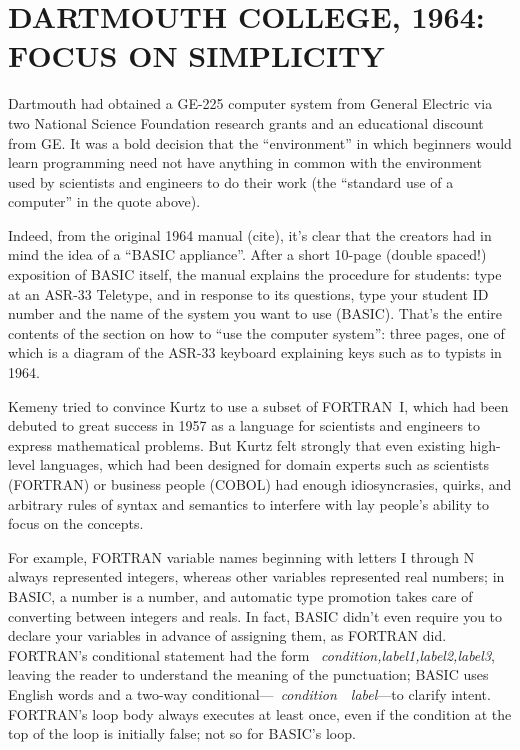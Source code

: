 \documentclass{article}
\begin{document}
\section{DARTMOUTH COLLEGE, 1964: FOCUS ON SIMPLICITY}



Dartmouth had obtained a GE-225 computer system from General Electric
via two National Science Foundation research grants and
an educational discount from GE.  It was a bold decision that the
``environment'' in which beginners would learn programming need not have
anything in common with the environment used by scientists and engineers
to do their work (the ``standard use of a computer'' in the quote above).

Indeed, from the original 1964 manual (cite), it's clear that the
creators had in mind the idea of a ``BASIC appliance''.
After a short 10-page (double spaced!) exposition of BASIC itself, the
manual explains the procedure for students: type  at an ASR-33
Teletype, and in response to its questions, type your student ID number
and the name of the system you want to use (BASIC).
That's the entire contents of the section on how to ``use the computer
system'': three pages, one of which is a diagram of the ASR-33 keyboard
explaining keys such as  to typists in 1964.



Kemeny tried to convince Kurtz to use a subset of FORTRAN~I, which had
been debuted to great success in 1957 as a language for scientists and
engineers to express mathematical problems.  
But Kurtz felt strongly that even existing high-level
languages, which had been designed for domain experts such as scientists
(FORTRAN) or business people (COBOL) 
had enough idiosyncrasies, quirks, and arbitrary rules of syntax and
semantics to interfere with lay people's ability to focus on the
concepts.  

For example, FORTRAN variable names beginning with letters I
through N always represented integers, whereas other variables represented
real numbers; in BASIC, a number is a number, and automatic type
promotion takes care of converting between integers and reals.  In
fact, BASIC didn't even require you to declare your variables in
advance of assigning them, as FORTRAN did.  FORTRAN's
conditional statement had the form 
~\emph{condition,label1,label2,label3}, leaving the reader to
understand the meaning of the punctuation; BASIC uses English
words and a two-way
conditional---~\emph{condition}~~\emph{label}---to
clarify intent.  FORTRAN's  loop body always executes at least once,
even if the condition at the top of the loop is initially false; not
so for BASIC's  loop.
\end{document}

